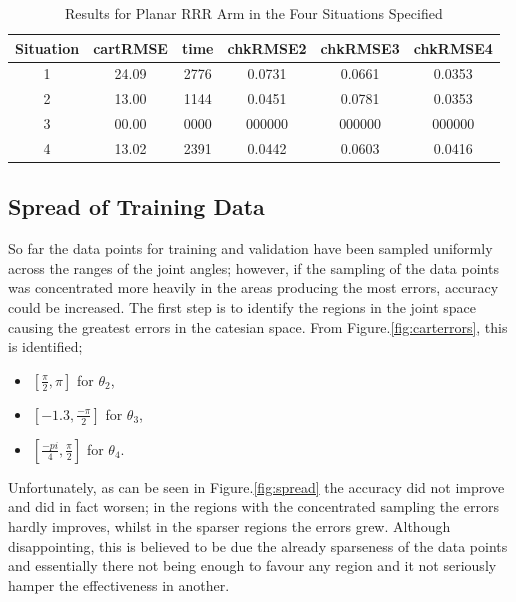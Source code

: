 \documentclass[11.5pt, twoside, a4paper]{article}
\begin{document}
\begin{table} 
\begin{center}
\begin{tabular}{|c | c | c | c | c| c|} 
\hline
Situation &   cartRMSE & time & chkRMSE2 & chkRMSE3 & chkRMSE4 \\ \hline \hline
1 & 24.09 & 2776& 0.0731& 0.0661& 0.0353 \\ \hline
2 & 13.00 & 1144& 0.0451& 0.0781& 0.0353 \\ \hline
3 & 00.00 & 0000& 000000& 000000& 000000 \\ \hline %
4 & 13.02 & 2391& 0.0442& 0.0603& 0.0416 \\ \hline
\end{tabular}
\caption{Results for Planar RRR Arm in the Four Situations Specified \label{tab:situations}}
\end{center}
\end{table}


\subsection{Spread of Training Data} \label{sec:spread}

So far the data points for training and validation have been sampled uniformly across the ranges of the joint angles; however, if the sampling of the data points was concentrated more heavily in the areas producing the most errors, accuracy could be increased. The first step is to identify the regions in the joint space causing the greatest errors in the catesian space. From Figure.\ref{fig:carterrors}, this is identified;
\begin{itemize}
\item $\left[\frac{\pi}{2}, \pi\right]$ for $\theta_2$, 
\item $\left[-1.3, \frac{-\pi}{2}\right]$ for $\theta_3$, 
\item $\left[\frac{-pi}{4}, \frac{\pi}{2}\right]$ for $\theta_4$.
\end{itemize}

Unfortunately, as can be seen in Figure.\ref{fig:spread} the accuracy did not improve and did in fact worsen; in the regions with the concentrated sampling the errors hardly improves, whilst in the sparser regions the errors grew. Although disappointing, this is believed to be due the already sparseness of the data points and essentially there not being enough to favour any region and it not seriously hamper the effectiveness in another.
\end{document}

